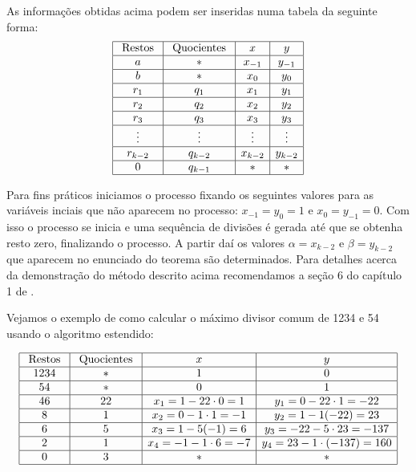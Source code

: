As informa\c{c}\~{o}es obtidas acima podem ser inseridas numa tabela da seguinte forma:
\[
\begin{array}{|c|c|c|c|}\hline
\textrm{ Restos } & \textrm{ Quocientes } & x       & y \\ \hline
				a 	      & \ast     							& x_{-1}  & y_{-1} \\ \hline
				b  			  & \ast     							& x_{0}   & y_{0} \\ \hline
				r_{1}     & q_{1}   					 	  & x_{1}   & y_{1} \\ \hline
				r_{2}     & q_{2}    							& x_{2}   & y_{2} \\ \hline
				r_{3}     & q_{3}    							& x_{3}   & y_{3} \\ \hline  
				\vdots    & \vdots   							& \vdots  & \vdots \\ \hline
				r_{k-2}   & q_{k-2}  							& x_{k-2} & y_{k-2} \\ \hline
				0         & q_{k-1}  							& \ast    & \ast    \\ \hline
\end{array}
\]

Para fins pr\'{a}ticos iniciamos o processo fixando os seguintes valores para as vari\'{a}veis inciais
que n\~{a}o aparecem no processo: $x_{-1}=y_{0}=1$ e $x_{0}=y_{-1}=0$. Com isso o processo se inicia e 
uma sequ\^{e}ncia de divis\~{o}es \'{e} gerada at\'{e} que se obtenha resto zero, finalizando o processo. 
A partir da\'{i} os valores $\alpha=x_{k-2}$ e $\beta=y_{k-2}$ que aparecem no 
enunciado do teorema s\~{a}o determinados. Para detalhes acerca da demonstra\c{c}\~{a}o do m\'{e}todo descrito acima recomendamos 
a se\c{c}\~{a}o 6 do cap\'{i}tulo 1 de \cite{cou:2014}. 

Vejamos o exemplo de como calcular o m\'{a}ximo divisor comum de 1234 e 54 usando o algoritmo estendido:

\[
\begin{array}{|c|c|c|c|}\hline
\textrm{ Restos } & \textrm{ Quocientes } & x       								& y \\ \hline
				1234 	    & \ast     							& 1      									& 0 \\ \hline
				54  			& \ast     							& 0       								& 1 \\ \hline
				46        & 22   					 	  		& x_{1}=1-22\cdot 0 = 1   & y_{1}=0-22\cdot 1=-22 \\ \hline
				8     		& 1    									& x_{2}=0-1\cdot 1=-1     & y_{2}=1-1(-22)=23 \\ \hline
				6    	  	& 5    									& x_{3}=1-5(-1)=6         & y_{3}=-22-5\cdot 23=-137 \\ \hline  
				2    			& 1   									& x_{4}=-1-1\cdot 6=-7    & y_{4}=23-1\cdot(-137)=160 \\ \hline
				0   			& 3  										& \ast                    & \ast    \\ \hline
\end{array}
\]

